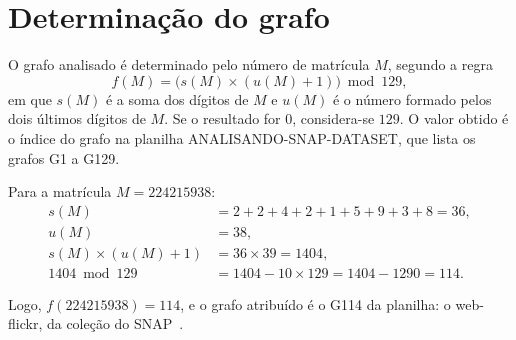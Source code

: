 \section{Determinação do grafo}
\label{sec:determinacao}

O grafo analisado é determinado pelo número de matrícula $M$, segundo a regra
\begin{equation}
  f(M) = \big(s(M) \times (u(M) + 1)\big) \bmod 129,
\end{equation}
em que $s(M)$ é a soma dos dígitos de $M$ e $u(M)$ é o número formado pelos dois últimos dígitos de $M$. Se o resultado for $0$, considera-se $129$. O valor obtido é o índice do grafo na planilha ANALISANDO-SNAP-DATASET, que lista os grafos G1 a G129.

Para a matrícula $M = 224215938$:
\begin{align*}
  s(M) &= 2 + 2 + 4 + 2 + 1 + 5 + 9 + 3 + 8 = 36,\\
  u(M) &= 38,\\
  s(M) \times (u(M) + 1) &= 36 \times 39 = 1404,\\
  1404 \bmod 129 &= 1404 - 10 \times 129 = 1404 - 1290 = 114.
\end{align*}

Logo, $f(224215938) = 114$, e o grafo atribuído é o G114 da planilha: o web-flickr, da coleção do SNAP~\cite{snapnets}.
